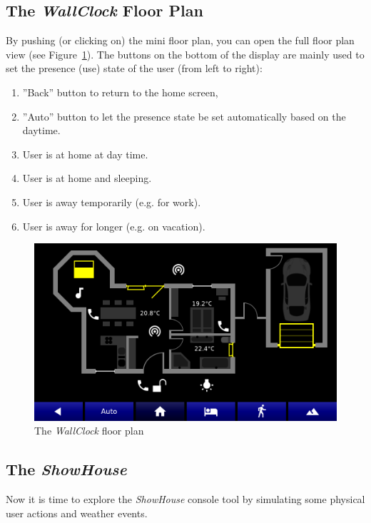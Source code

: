 \documentclass[12pt,english,parskip=half,headheight=19pt]{scrreprt}
\begin{document}
\subsection{The \textit{WallClock} Floor Plan}
\label{sec:tutorial-firststeps-floorplan}

By pushing (or clicking on) the mini floor plan, you can open the full floor plan view (see Figure~\ref{fig:tutorial-floorplan}). The buttons on the bottom of the display are mainly used to set the presence (use) state of the user (from left to right):

\begin{enumerate}
  \item ''Back'' button to return to the home screen,
  \item ''Auto'' button to let the presence state be set automatically based on the daytime.
  \item User is at home at day time.
  \item User is at home and sleeping.
  \item User is away temporarily (e.g. for work).
  \item User is away for longer (e.g. on vacation).
\end{enumerate}

\begin{figure}[ht]
  \centering
  \includegraphics[width=0.7\linewidth]{figs/wallclock-floorplan-3.png}
  \caption[l]{The \textit{WallClock} floor plan}
  \label{fig:tutorial-floorplan}
\end{figure}




\subsection{The \textit{ShowHouse}}
\label{sec:tutorial-firststeps-showhouse}

Now it is time to explore the \textit{ShowHouse} console tool by simulating some physical user actions and weather events.
\end{document}
